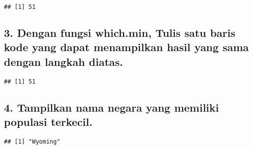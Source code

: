 \documentclass[
]{article}
\newenvironment{Shaded}{\begin{snugshade}}{\end{snugshade}}
\newcommand{\DecValTok}[1]{\textcolor[rgb]{0.00,0.00,0.81}{#1}}
\newcommand{\FunctionTok}[1]{\textcolor[rgb]{0.00,0.00,0.00}{#1}}
\newcommand{\NormalTok}[1]{#1}
\newcommand{\OtherTok}[1]{\textcolor[rgb]{0.56,0.35,0.01}{#1}}
\newcommand{\SpecialCharTok}[1]{\textcolor[rgb]{0.00,0.00,0.00}{#1}}
\begin{document}
\begin{Shaded}
\end{Shaded}

\begin{verbatim}
## [1] 51
\end{verbatim}

\hypertarget{dengan-fungsi-which.min-tulis-satu-baris-kode-yang-dapat-menampilkan-hasil-yang-sama-dengan-langkah-diatas.}{%
\subsection{3. Dengan fungsi which.min, Tulis satu baris kode yang dapat
menampilkan hasil yang sama dengan langkah
diatas.}\label{dengan-fungsi-which.min-tulis-satu-baris-kode-yang-dapat-menampilkan-hasil-yang-sama-dengan-langkah-diatas.}}

\begin{Shaded}
\end{Shaded}

\begin{verbatim}
## [1] 51
\end{verbatim}

\hypertarget{tampilkan-nama-negara-yang-memiliki-populasi-terkecil.}{%
\subsection{4. Tampilkan nama negara yang memiliki populasi
terkecil.}\label{tampilkan-nama-negara-yang-memiliki-populasi-terkecil.}}

\begin{Shaded}
\end{Shaded}

\begin{verbatim}
## [1] "Wyoming"
\end{verbatim}
\end{document}
